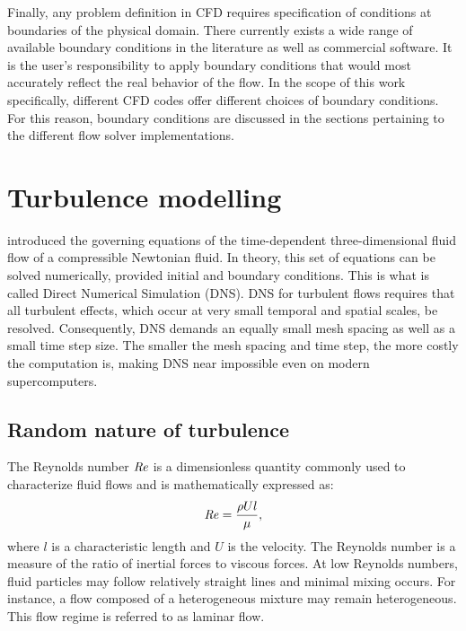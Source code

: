 %
Finally, any problem definition in CFD requires specification of conditions at boundaries of the physical domain. There currently exists a wide range of available boundary conditions in the literature as well as commercial software. It is the user's responsibility to apply boundary conditions that would most accurately reflect the real behavior of the flow. In the scope of this work specifically, different CFD codes offer different choices of boundary conditions. For this reason, boundary conditions are discussed in the sections pertaining to the different flow solver implementations.
%
%
\section{Turbulence modelling}
\label{sec:turb}
%
 introduced the governing equations of the time-dependent three-dimensional fluid flow of a compressible Newtonian fluid. In theory, this set of equations can be solved numerically, provided initial and boundary conditions. This is what is called Direct Numerical Simulation (DNS). DNS for turbulent flows requires that all turbulent effects, which occur at very small temporal and spatial scales, be resolved. Consequently, DNS demands an equally small mesh spacing as well as a small time step size. The smaller the mesh spacing and time step, the more costly the computation is, making DNS near impossible even on modern supercomputers.
%
\subsection{Random nature of turbulence}
%
The Reynolds number $\mbox{\textit{Re}}$ is a dimensionless quantity commonly used to characterize fluid flows and is mathematically expressed as:
\begin{equation*}
    \mbox{\textit{Re}} = \frac{\rho U l}{\mu},
\end{equation*}
where $l$ is a characteristic length and $U$ is the velocity. The Reynolds number is a measure of the ratio of inertial forces to viscous forces. At low Reynolds numbers, fluid particles may follow relatively straight lines and minimal mixing occurs. For instance, a flow composed of a heterogeneous mixture may remain heterogeneous. This flow regime is referred to as laminar flow.

